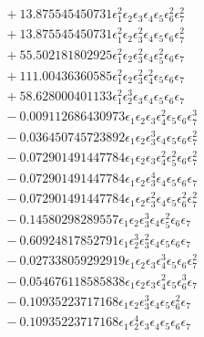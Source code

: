 \documentclass[10pt]{article}
\begin{document}
\begin{align*}
&{}  + 13.875545450731 \epsilon_{1}^{2} \epsilon_{2} \epsilon_{3} \epsilon_{4} \epsilon_{5} \epsilon_{6}^{2} \epsilon_{7}^{2} \\
&{}  + 13.875545450731 \epsilon_{1}^{2} \epsilon_{2} \epsilon_{3}^{2} \epsilon_{4} \epsilon_{5} \epsilon_{6} \epsilon_{7}^{2} \\
&{}  + 55.502181802925 \epsilon_{1}^{2} \epsilon_{2} \epsilon_{3}^{2} \epsilon_{4} \epsilon_{5}^{2} \epsilon_{6} \epsilon_{7} \\
&{}  + 111.00436360585 \epsilon_{1}^{2} \epsilon_{2} \epsilon_{3}^{2} \epsilon_{4}^{2} \epsilon_{5} \epsilon_{6} \epsilon_{7} \\
&{}  + 58.628000401133 \epsilon_{1}^{2} \epsilon_{2}^{3} \epsilon_{3} \epsilon_{4} \epsilon_{5} \epsilon_{6} \epsilon_{7} \\
&{}  - 0.009112686430973 \epsilon_{1} \epsilon_{2} \epsilon_{3} \epsilon_{4}^{2} \epsilon_{5} \epsilon_{6} \epsilon_{7}^{3} \\
&{}  - 0.036450745723892 \epsilon_{1} \epsilon_{2} \epsilon_{3}^{3} \epsilon_{4} \epsilon_{5} \epsilon_{6} \epsilon_{7}^{2} \\
&{}  - 0.072901491447784 \epsilon_{1} \epsilon_{2} \epsilon_{3} \epsilon_{4}^{2} \epsilon_{5}^{2} \epsilon_{6} \epsilon_{7}^{2} \\
&{}  - 0.072901491447784 \epsilon_{1} \epsilon_{2} \epsilon_{3}^{4} \epsilon_{4} \epsilon_{5} \epsilon_{6} \epsilon_{7} \\
&{}  - 0.072901491447784 \epsilon_{1} \epsilon_{2} \epsilon_{3}^{2} \epsilon_{4} \epsilon_{5} \epsilon_{6}^{2} \epsilon_{7}^{2} \\
&{}  - 0.14580298289557 \epsilon_{1} \epsilon_{2} \epsilon_{3}^{3} \epsilon_{4} \epsilon_{5}^{2} \epsilon_{6} \epsilon_{7} \\
&{}  - 0.60924817852791 \epsilon_{1} \epsilon_{2}^{3} \epsilon_{3}^{2} \epsilon_{4} \epsilon_{5} \epsilon_{6} \epsilon_{7} \\
&{}  - 0.027338059292919 \epsilon_{1} \epsilon_{2} \epsilon_{3} \epsilon_{4}^{3} \epsilon_{5} \epsilon_{6} \epsilon_{7}^{2} \\
&{}  - 0.054676118585838 \epsilon_{1} \epsilon_{2} \epsilon_{3} \epsilon_{4}^{2} \epsilon_{5} \epsilon_{6}^{3} \epsilon_{7} \\
&{}  - 0.10935223717168 \epsilon_{1} \epsilon_{2} \epsilon_{3}^{3} \epsilon_{4} \epsilon_{5} \epsilon_{6}^{2} \epsilon_{7} \\
&{}  - 0.10935223717168 \epsilon_{1} \epsilon_{2}^{4} \epsilon_{3} \epsilon_{4} \epsilon_{5} \epsilon_{6} \epsilon_{7} \\

\end{align*}
\end{document}

